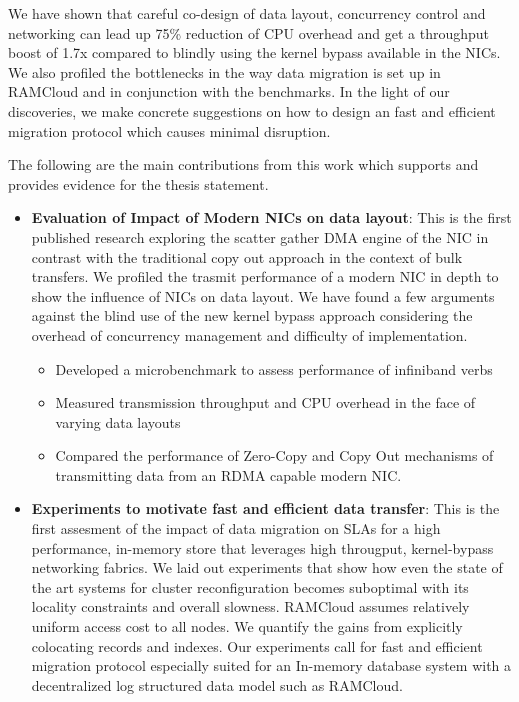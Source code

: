 We have shown that careful co-design of data layout, concurrency control
and networking can lead up 75\% reduction of CPU overhead and  get a throughput
boost of 1.7x compared to blindly using the kernel bypass available
in the NICs. We also profiled the bottlenecks in the way data migration is set up
in RAMCloud and in conjunction with the benchmarks. In the light of our discoveries,
we make concrete suggestions on how to design an fast and efficient migration 
protocol which causes minimal disruption.

The following are the main contributions from this work which supports and provides
evidence for the thesis statement.

\begin{itemize}

\item{\textbf{Evaluation of Impact of Modern NICs on data layout}}: This is the first published research exploring the scatter gather DMA engine of the NIC in contrast with the traditional copy out approach in the context of bulk transfers. 
 We profiled the trasmit performance of a modern NIC in depth to show the influence of NICs on data layout. 
 We have found a few arguments against the blind use of the new kernel bypass approach considering
 the overhead of concurrency management and difficulty of implementation.
\begin{itemize}

\item Developed a microbenchmark to assess performance of infiniband verbs

\item Measured transmission throughput and CPU overhead in the face of varying
data layouts

\item Compared the performance of Zero-Copy and Copy Out mechanisms of 
transmitting data from an RDMA capable modern NIC.

\end{itemize} 


\item{\textbf{Experiments to motivate fast and efficient data transfer}}: This is the first assesment of the impact of data migration on SLAs for a high performance,
  in-memory store that leverages high througput, kernel-bypass networking fabrics. 
We laid out experiments that show how even the state of the art systems for cluster reconfiguration becomes suboptimal with its locality constraints and overall slowness. 
 RAMCloud assumes relatively uniform access cost to all nodes.
 We quantify the gains from explicitly colocating records and indexes.
 Our experiments call for fast and efficient migration protocol especially suited for an In-memory database system with a decentralized log structured data model such as RAMCloud.


\end{itemize}
